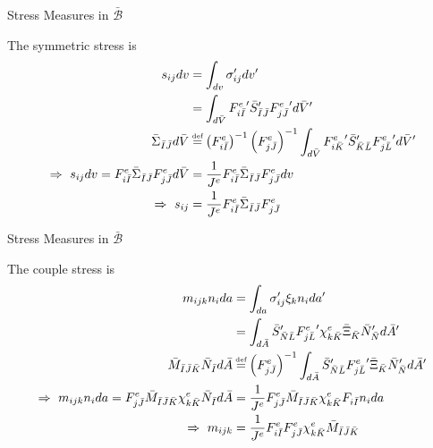 \documentclass[11pt]{beamer}
\newcommand\defeq{\mathrel{\stackrel{\makebox[0pt]{\mbox{\normalfont\tiny def}}}{=}}}
\begin{document}
\begin{frame}{Stress Measures in $\bar{\mathcal{B}}$}%

The symmetric stress is
\begin{align*}
s_{ij} dv &= \int_{dv} \sigma_{ij}' dv'\\
&= \int_{d\bar{V}} {F_{i\bar{I}}^e}' \bar{S}_{\bar{I}\bar{J}}' {F_{j\bar{J}}^e}' d\bar{V}'\\
\bar{\Sigma}_{\bar{I}\bar{J}} d\bar{V} &\defeq  \left(F_{i\bar{I}}^e\right)^{-1} \left(F_{j\bar{J}}^e\right)^{-1} \int_{d\bar{V}} {F_{i\bar{K}}^e}' \bar{S}_{\bar{K}\bar{L}}' {F_{j\bar{L}}^e}' d\bar{V}'\\
\Rightarrow\ s_{ij} dv = F_{i\bar{I}}^e \bar{\Sigma}_{\bar{I}\bar{J}} F_{j\bar{J}}^e d\bar{V} &= \frac{1}{{J^e}} F_{i\bar{I}}^e \bar{\Sigma}_{\bar{I}\bar{J}} F_{j\bar{J}}^e dv\\
\Rightarrow\ s_{ij} &= \frac{1}{{J^e}} F_{i\bar{I}}^e \bar{\Sigma}_{\bar{I}\bar{J}} F_{j\bar{J}}^e\\
\end{align*}

\end{frame}

\begin{frame}{Stress Measures in $\bar{\mathcal{B}}$}%

The couple stress is
\begin{align*}
m_{ijk}n_i da &= \int_{da} \sigma_{ij}' \xi_k n_i da'\\
&= \int_{d\bar{A}} \bar{S}_{\bar{N}\bar{L}}' {F_{j\bar{L}}^e}' \chi_{k\bar{K}}^e\bar{\Xi}_{\bar{K}} \bar{N}_{\bar{N}}' d\bar{A}'\\
\bar{M}_{\bar{I}\bar{J}\bar{K}} \bar{N}_{\bar{I}} d\bar{A} &\defeq \left(F_{j\bar{J}}^e\right)^{-1} \int_{d\bar{A}} \bar{S}_{\bar{N}\bar{L}}' {F_{j\bar{L}}^e}'\bar{\Xi}_{\bar{K}} \bar{N}_{\bar{N}}' d\bar{A}'\\
\Rightarrow\ m_{ijk} n_i da = F_{j\bar{J}}^e \bar{M}_{\bar{I}\bar{J}\bar{K}} \chi_{k\bar{K}}^e \bar{N}_{\bar{I}} d\bar{A} &= \frac{1}{{J^e}} F_{j\bar{J}}^e \bar{M}_{\bar{I}\bar{J}\bar{K}} \chi_{k\bar{K}}^e F_{i \bar{I}} n_i da\\
\Rightarrow\ m_{ijk} &= \frac{1}{{J^e}} F_{i \bar{I}}^e F_{j\bar{J}}^e \chi_{k\bar{K}}^e  \bar{M}_{\bar{I}\bar{J}\bar{K}}
\end{align*}

\end{frame}
\end{document}
